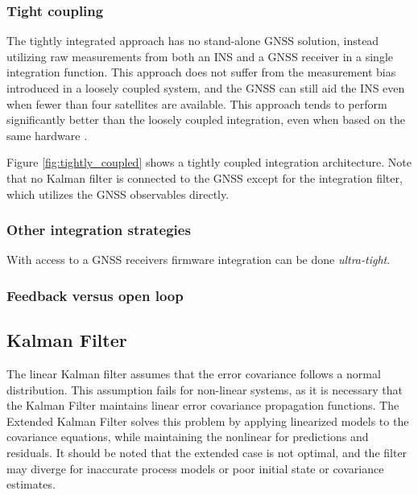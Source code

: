     \subsubsection{Tight coupling}
    The tightly integrated approach has no stand-alone GNSS solution, instead utilizing raw measurements from both an INS and a GNSS receiver in a single integration function. This approach does not suffer from the measurement bias introduced in a loosely coupled system, and the GNSS can still aid the INS even when fewer than four satellites are available. This approach tends to perform significantly better than the loosely coupled integration, even when based on the same hardware \cite{falco2017loose, tawk2014implementation, groves2013principles}. 

    Figure \ref{fig:tightly_coupled} shows a tightly coupled integration architecture. Note that no Kalman filter is connected to the GNSS except for the integration filter, which utilizes the GNSS observables directly.\\

    \subsubsection{Other integration strategies}
    With access to a GNSS receivers firmware integration can be done \textit{ultra-tight}. 
    
    \subsubsection{Feedback versus open loop}
    
    
\subsection{Kalman Filter}
    
The linear Kalman filter assumes that the error covariance follows a normal distribution. This assumption fails for non-linear systems, as it is necessary that the Kalman Filter maintains linear error covariance propagation functions. The Extended Kalman Filter solves this problem by applying linearized models to the covariance equations, while maintaining the nonlinear for predictions and residuals. It should be noted that the extended case is not optimal, and the filter may diverge for inaccurate process models or poor initial state or covariance estimates.  \\

